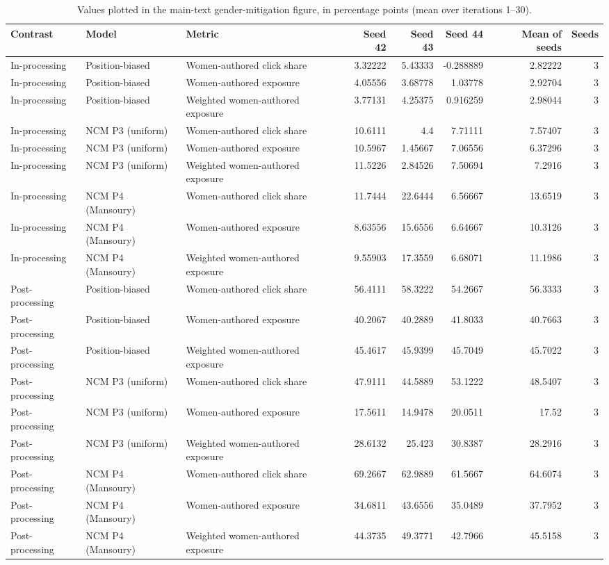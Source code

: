 \begin{table}[htbp!]
\centering
\small
\setlength{\tabcolsep}{3pt}
\renewcommand{\arraystretch}{1.1}
\begin{tabular}{lllrrrrr}
\hline
Contrast & Model & Metric & Seed 42 & Seed 43 & Seed 44 & Mean of seeds & Seeds \\
\hline
In-processing & Position-biased & Women-authored click share & 3.32222 & 5.43333 & -0.288889 & 2.82222 & 3 \\
In-processing & Position-biased & Women-authored exposure & 4.05556 & 3.68778 & 1.03778 & 2.92704 & 3 \\
In-processing & Position-biased & Weighted women-authored exposure & 3.77131 & 4.25375 & 0.916259 & 2.98044 & 3 \\
In-processing & NCM P3 (uniform) & Women-authored click share & 10.6111 & 4.4 & 7.71111 & 7.57407 & 3 \\
In-processing & NCM P3 (uniform) & Women-authored exposure & 10.5967 & 1.45667 & 7.06556 & 6.37296 & 3 \\
In-processing & NCM P3 (uniform) & Weighted women-authored exposure & 11.5226 & 2.84526 & 7.50694 & 7.2916 & 3 \\
In-processing & NCM P4 (Mansoury) & Women-authored click share & 11.7444 & 22.6444 & 6.56667 & 13.6519 & 3 \\
In-processing & NCM P4 (Mansoury) & Women-authored exposure & 8.63556 & 15.6556 & 6.64667 & 10.3126 & 3 \\
In-processing & NCM P4 (Mansoury) & Weighted women-authored exposure & 9.55903 & 17.3559 & 6.68071 & 11.1986 & 3 \\
Post-processing & Position-biased & Women-authored click share & 56.4111 & 58.3222 & 54.2667 & 56.3333 & 3 \\
Post-processing & Position-biased & Women-authored exposure & 40.2067 & 40.2889 & 41.8033 & 40.7663 & 3 \\
Post-processing & Position-biased & Weighted women-authored exposure & 45.4617 & 45.9399 & 45.7049 & 45.7022 & 3 \\
Post-processing & NCM P3 (uniform) & Women-authored click share & 47.9111 & 44.5889 & 53.1222 & 48.5407 & 3 \\
Post-processing & NCM P3 (uniform) & Women-authored exposure & 17.5611 & 14.9478 & 20.0511 & 17.52 & 3 \\
Post-processing & NCM P3 (uniform) & Weighted women-authored exposure & 28.6132 & 25.423 & 30.8387 & 28.2916 & 3 \\
Post-processing & NCM P4 (Mansoury) & Women-authored click share & 69.2667 & 62.9889 & 61.5667 & 64.6074 & 3 \\
Post-processing & NCM P4 (Mansoury) & Women-authored exposure & 34.6811 & 43.6556 & 35.0489 & 37.7952 & 3 \\
Post-processing & NCM P4 (Mansoury) & Weighted women-authored exposure & 44.3735 & 49.3771 & 42.7966 & 45.5158 & 3 \\
\hline
\end{tabular}
\caption{Values plotted in the main-text gender-mitigation figure, in percentage points (mean over iterations 1--30).}
\label{chap:results:tab:main_rq7_gender_mitigation_l2_values}
\end{table}

